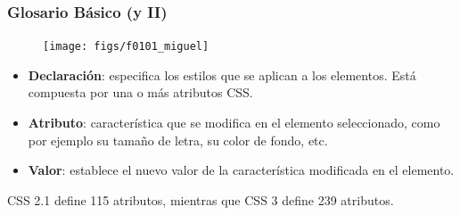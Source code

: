 \documentclass[ucs]{beamer}
\begin{document}

\begin{frame}
\frametitle{Glosario Básico (y II)}

\begin{center}
\begin{figure}[p]
\texttt{[image: figs/f0101\_miguel]}
\end{figure}
\end{center}

\begin{itemize}
  \item {\bf Declaración}: especifica los estilos que se aplican a los elementos. Está compuesta por una o más atributos CSS.
  \item {\bf Atributo}: característica que se modifica en el elemento seleccionado, como por ejemplo su tamaño de letra, su color de fondo, etc.
  \item {\bf Valor}: establece el nuevo valor de la característica modificada en el elemento.
\end{itemize}

CSS 2.1 define 115 atributos, mientras que CSS 3 define 239 atributos.

\end{frame}

%
%
%
\end{document}
